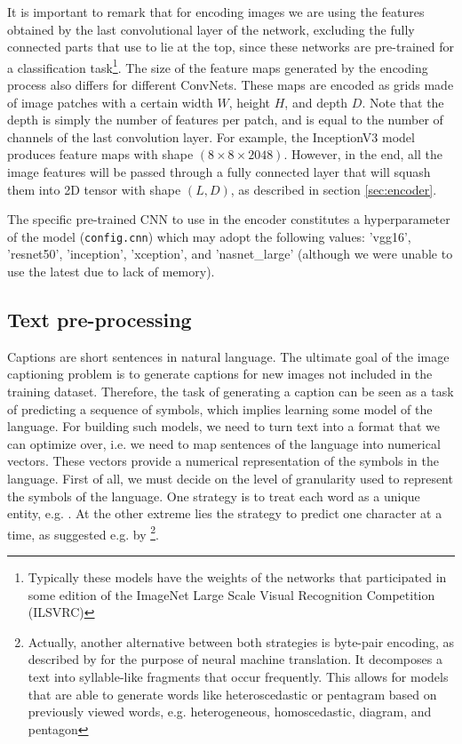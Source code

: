 It is important to remark that for encoding images we are using the features obtained by the last convolutional layer of the network, excluding the fully connected parts that use to lie at the top, since these networks are pre-trained for a classification task\footnote{Typically these models have the weights of the networks that participated in some edition of the ImageNet Large Scale Visual Recognition Competition (ILSVRC)}.
The size of the feature maps generated by the encoding process also differs for different ConvNets. These maps are encoded as grids made of image patches with a certain width $W$, height $H$, and depth $D$. Note that the depth is simply the number of features per patch, and is equal to the number of channels of the last convolution layer. For example, the InceptionV3 model produces feature maps with shape $(8 \times 8 \times 2048)$. However, in the end, all the image features will be passed through a fully connected layer that will squash them into 2D tensor with shape $(L,D)$, as described in section \cref{sec:encoder}. 

The specific pre-trained CNN to use in the encoder constitutes a hyperparameter of the model (\lstinline{config.cnn}) which may adopt the following values: 'vgg16', 'resnet50', 'inception', 'xception', and 'nasnet\_large' (although we were unable to use the latest due to lack of memory).

\subsection{Text pre-processing}

Captions are short sentences in natural language. The ultimate goal of the image captioning problem is to generate captions for new images not included in the training dataset. Therefore, the task of generating a caption can be seen as a task of predicting a sequence of symbols, which implies learning some model of the language. For building such models, we need to turn text into a format that we can optimize over, i.e. we need to map sentences of the language into numerical vectors. These vectors provide a numerical representation of the symbols in the language. First of all, we must decide on the level of granularity used to represent the symbols of the language. One strategy is to treat each word as a unique entity, e.g. \citep{Salton1975}. At the other extreme lies the strategy to predict one character at a time, as suggested e.g. by \citet{Ling2015} \footnote{Actually, another alternative between both strategies is byte-pair encoding, as described by \citet{Sennrich2016} for the purpose of neural machine translation. It decomposes a text into syllable-like fragments that occur frequently. This allows for models that are able to generate words like heteroscedastic or pentagram based on previously viewed words, e.g. heterogeneous, homoscedastic, diagram, and pentagon}. 

